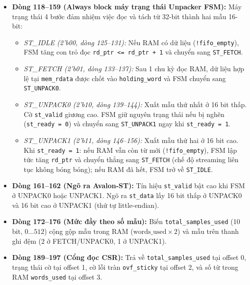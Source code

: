 \begin{itemize}[leftmargin=1.5em, itemsep=2pt]
    \item \textbf{Dòng 118--159 (Always block máy trạng thái Unpacker FSM):} Máy trạng thái 4 bước đảm nhiệm việc đọc và tách từ 32-bit thành hai mẫu 16-bit:
    \begin{itemize}[leftmargin=1.2em, itemsep=1pt]
        \item \emph{ST\_IDLE (2'b00, dòng 125--131):} Nếu RAM có dữ liệu (\texttt{!fifo\_empty}), FSM tăng con trỏ đọc \texttt{rd\_ptr <= rd\_ptr + 1} và chuyển sang \texttt{ST\_FETCH}.
        \item \emph{ST\_FETCH (2'b01, dòng 133--137):} Sau 1 chu kỳ đọc RAM, dữ liệu hợp lệ tại \texttt{mem\_rdata} được chốt vào \texttt{holding\_word} và FSM chuyển sang \texttt{ST\_UNPACK0}.
        \item \emph{ST\_UNPACK0 (2'b10, dòng 139--144):} Xuất mẫu thứ nhất ở 16 bit thấp. Cờ \texttt{st\_valid} giương cao. FSM giữ nguyên trạng thái nếu bị nghẽn (\texttt{st\_ready = 0}) và chuyển sang \texttt{ST\_UNPACK1} ngay khi \texttt{st\_ready = 1}.
        \item \emph{ST\_UNPACK1 (2'b11, dòng 146--156):} Xuất mẫu thứ hai ở 16 bit cao. Khi \texttt{st\_ready = 1}: nếu RAM vẫn còn từ mới (\texttt{!fifo\_empty}), FSM lập tức tăng \texttt{rd\_ptr} và chuyển thẳng sang \texttt{ST\_FETCH} (chế độ streaming liên tục không bóng bóng); nếu RAM đã hết, FSM trở về \texttt{ST\_IDLE}.
    \end{itemize}
    \item \textbf{Dòng 161--162 (Ngõ ra Avalon-ST):} Tín hiệu \texttt{st\_valid} bật cao khi FSM ở UNPACK0 hoặc UNPACK1. Ngõ ra \texttt{st\_data} lấy 16 bit thấp ở UNPACK0 và 16 bit cao ở UNPACK1 (thứ tự little-endian).
    \item \textbf{Dòng 172--176 (Mức đầy theo số mẫu):} Biến \texttt{total\_samples\_used} (10 bit, $0 \dots 512$) cộng gộp mẫu trong RAM ($\text{words\_used} \times 2$) và mẫu trên thanh ghi đệm (2 ở FETCH/UNPACK0, 1 ở UNPACK1).
    \item \textbf{Dòng 189--197 (Cổng đọc CSR):} Trả về \texttt{total\_samples\_used} tại offset 0, trạng thái cờ tại offset 1, cờ lỗi tràn \texttt{ovf\_sticky} tại offset 2, và số từ trong RAM \texttt{words\_used} tại offset 3.
\end{itemize}

